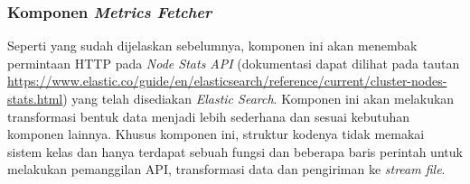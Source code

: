 \subsubsection{Komponen \textbf{\textit{Metrics Fetcher}}}
Seperti yang sudah dijelaskan sebelumnya, komponen ini akan menembak permintaan HTTP pada \textit{Node Stats API} (dokumentasi dapat dilihat pada tautan \url{https://www.elastic.co/guide/en/elasticsearch/reference/current/cluster-nodes-stats.html}) yang telah disediakan \textit{Elastic Search}. Komponen ini akan melakukan transformasi bentuk data menjadi lebih sederhana dan sesuai kebutuhan komponen lainnya. Khusus komponen ini, struktur kodenya tidak memakai sistem kelas dan hanya terdapat sebuah fungsi dan beberapa baris perintah untuk melakukan pemanggilan API, transformasi data dan pengiriman ke \textit{stream file}.